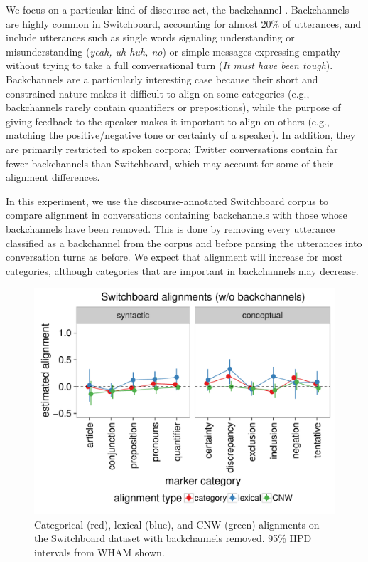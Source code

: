 \documentclass[11pt]{article}
\begin{document}
We focus on a particular kind of discourse act, the backchannel \cite{Yngve1970}. Backchannels are highly common in Switchboard, accounting for almost 20\% of utterances, and include utterances such as single words signaling understanding or misunderstanding (\textit{yeah, uh-huh, no}) or simple messages expressing empathy without trying to take a full conversational turn (\textit{It must have been tough}).  Backchannels are a particularly interesting case because their short and constrained nature makes it difficult to align on some categories (e.g., backchannels rarely contain quantifiers or prepositions), while the purpose of giving feedback to the speaker makes it important to align on others (e.g., matching the positive/negative tone or certainty of a speaker).  In addition, they are primarily restricted to spoken corpora; Twitter conversations contain far fewer backchannels than Switchboard, which may account for some of their alignment differences.

In this experiment, we use the discourse-annotated Switchboard corpus to compare alignment in conversations containing backchannels with those whose backchannels have been removed. This is done by removing every utterance classified as a backchannel from the corpus and before parsing the utterances into conversation turns as before. We expect that alignment will increase for most categories, although categories that are important in backchannels may decrease.

\begin{figure}[t]
  \begin{center}
    \includegraphics[width=\columnwidth]{results/swbdn_line.pdf}
  \end{center}
  \caption{Categorical (red), lexical (blue), and CNW (green) alignments on the Switchboard dataset with backchannels removed. 95\% HPD intervals from WHAM shown.}\label{fig:swbdn-res}
\end{figure}
\end{document}
